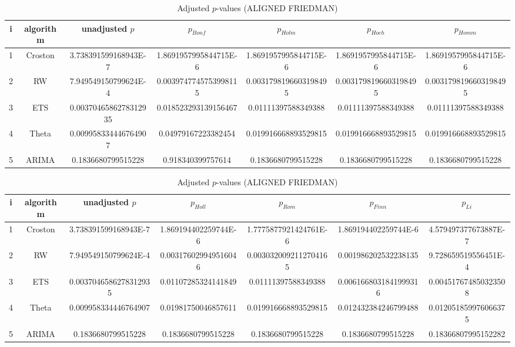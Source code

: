 \documentclass[a4paper,10pt]{article}
\begin{document}
\begin{landscape}
\begin{table}[!htp]
\centering\scriptsize
\caption{Adjusted $p$-values (ALIGNED FRIEDMAN)}
\begin{tabular}{ccccccc}
i&algorithm&unadjusted $p$&$p_{Bonf}$&$p_{Holm}$&$p_{Hoch}$&$p_{Homm}$\\
\hline
1&Croston&3.738391599168943E-7&1.8691957995844715E-6&1.8691957995844715E-6&1.8691957995844715E-6&1.8691957995844715E-6\\
2&RW&7.949549150799624E-4&0.0039747745753998115&0.0031798196603198495&0.0031798196603198495&0.0031798196603198495\\
3&ETS&0.0037046586278312935&0.018523293139156467&0.01111397588349388&0.01111397588349388&0.01111397588349388\\
4&Theta&0.009958334446764907&0.04979167223382454&0.019916668893529815&0.019916668893529815&0.019916668893529815\\
5&ARIMA&0.1836680799515228&0.918340399757614&0.1836680799515228&0.1836680799515228&0.1836680799515228\\
\hline
\end{tabular}
\end{table}

\begin{table}[!htp]
\centering\scriptsize
\caption{Adjusted $p$-values (ALIGNED FRIEDMAN)}
\begin{tabular}{ccccccc}
i&algorithm&unadjusted $p$&$p_{Holl}$&$p_{Rom}$&$p_{Finn}$&$p_{Li}$\\
\hline
1&Croston&3.738391599168943E-7&1.869194402259744E-6&1.7775877921424761E-6&1.869194402259744E-6&4.579497377673887E-7\\
2&RW&7.949549150799624E-4&0.003176029949516046&0.0030320092112704165&0.001986202532238135&9.728659519556451E-4\\
3&ETS&0.0037046586278312935&0.01107285324141849&0.01111397588349388&0.0061668031841999316&0.004517674850323508\\
4&Theta&0.009958334446764907&0.01981750046857611&0.019916668893529815&0.012432384246799488&0.012051859976066375\\
5&ARIMA&0.1836680799515228&0.1836680799515228&0.1836680799515228&0.1836680799515228&0.18366807995152282\\
\hline
\end{tabular}
\end{table}


\newpage


\end{landscape}
\end{document}
